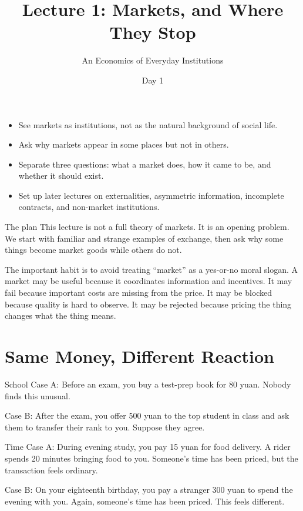 \documentclass[10pt,a4paper]{article}
\title{\vspace{-2em}\bfseries Lecture 1: Markets, and Where They Stop}
\author{An Economics of Everyday Institutions}
\date{Day 1}
\begin{document}
\maketitle
\thispagestyle{fancy}

\begin{goalsbox}
\begin{itemize}
  \item See markets as institutions, not as the natural background of social life.
  \item Ask why markets appear in some places but not in others.
  \item Separate three questions: what a market does, how it came to be, and whether it should exist.
  \item Set up later lectures on externalities, asymmetric information, incomplete contracts, and non-market institutions.
\end{itemize}
\end{goalsbox}

\begin{keybox}{The plan}
This lecture is not a full theory of markets. It is an opening problem. We start with familiar and strange examples of exchange, then ask why some things become market goods while others do not.

The important habit is to avoid treating ``market'' as a yes-or-no moral slogan. A market may be useful because it coordinates information and incentives. It may fail because important costs are missing from the price. It may be blocked because quality is hard to observe. It may be rejected because pricing the thing changes what the thing means.
\end{keybox}

\section{Same Money, Different Reaction}

\begin{examplebox}{School}
Case A: Before an exam, you buy a test-prep book for 80 yuan. Nobody finds this unusual.

Case B: After the exam, you offer 500 yuan to the top student in class and ask them to transfer their rank to you. Suppose they agree.
\end{examplebox}

\begin{examplebox}{Time}
Case A: During evening study, you pay 15 yuan for food delivery. A rider spends 20 minutes bringing food to you. Someone's time has been priced, but the transaction feels ordinary.

Case B: On your eighteenth birthday, you pay a stranger 300 yuan to spend the evening with you. Again, someone's time has been priced. This feels different.
\end{examplebox}
\end{document}
